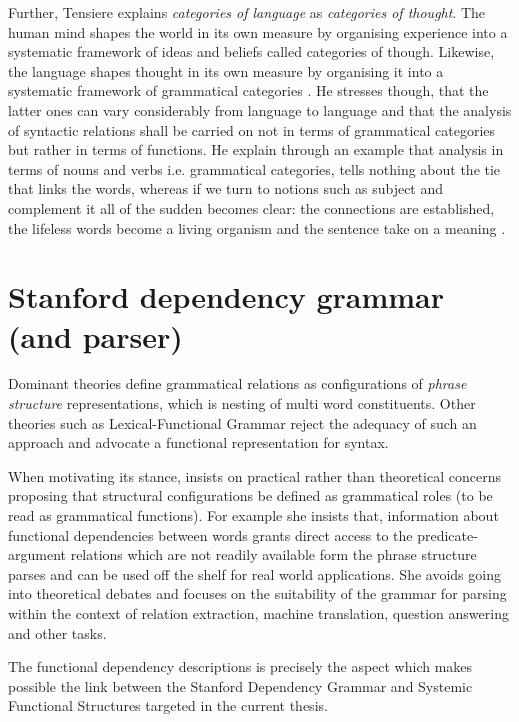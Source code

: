 Further, Tensiere explains \textit{categories of language} as \textit{categories of thought}. The human mind shapes the world in its own measure by organising experience into a systematic framework of ideas and beliefs called categories of though. Likewise, the language shapes thought in its own measure by organising it into a systematic framework of grammatical categories \citep{Tensiere2015}. He stresses though, that the latter ones can vary considerably from language to language and that the analysis of syntactic relations shall be carried on not in terms of grammatical categories but rather in terms of functions. He explain through an example that analysis in terms of nouns and verbs i.e. grammatical categories, tells nothing about the tie that links the words, whereas if we turn to notions such as subject and complement it all of the sudden becomes clear: the connections are established, the lifeless words become a living organism and the sentence take on a meaning \citep{Tensiere2015}.

\section{Stanford dependency grammar (and parser)}
Dominant \citet{Chomsky1981} theories define grammatical relations as configurations of \textit{phrase structure} representations, which is nesting of multi word constituents. Other theories such as Lexical-Functional Grammar reject the adequacy of such an approach \citep{Brensan2000} and advocate a functional representation for syntax.

When motivating its stance, \citet{Marneffe2006} insists on practical rather than theoretical concerns proposing that structural configurations be defined as grammatical roles (to be read as grammatical functions)\citep{Marneffe2006}. For example she insists that, information about functional dependencies between words grants direct access to the predicate-argument relations which are not readily available form the phrase structure parses and can be used off the shelf for real world applications. She avoids going into theoretical debates and focuses on the suitability of the grammar for parsing within the context of relation extraction, machine translation, question answering and other tasks.

The functional dependency descriptions is precisely the aspect which makes possible the link between the Stanford Dependency Grammar and Systemic Functional Structures targeted in the current thesis. 

